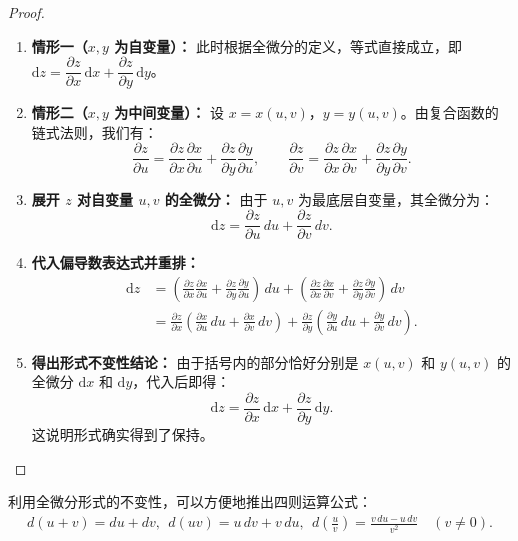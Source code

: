 \documentclass[lang=cn,11pt]{elegantbook}
\begin{document}
\begin{proof}
\begin{enumerate}
  \item \textbf{情形一（$x, y$ 为自变量）：}
  此时根据全微分的定义，等式直接成立，即 $\mathrm{d}z=\dfrac{\partial z}{\partial x}\,\mathrm{d}x+\dfrac{\partial z}{\partial y}\,\mathrm{d}y$。
  
  \item \textbf{情形二（$x, y$ 为中间变量）：}
  设 $x=x(u,v)$，$y=y(u,v)$。由复合函数的链式法则，我们有：
  \[
  \frac{\partial z}{\partial u}
  =\frac{\partial z}{\partial x}\frac{\partial x}{\partial u}
  +\frac{\partial z}{\partial y}\frac{\partial y}{\partial u},
  \qquad
  \frac{\partial z}{\partial v}
  =\frac{\partial z}{\partial x}\frac{\partial x}{\partial v}
  +\frac{\partial z}{\partial y}\frac{\partial y}{\partial v}.
  \]
  
  \item \textbf{展开 $z$ 对自变量 $u, v$ 的全微分：}
  由于 $u, v$ 为最底层自变量，其全微分为：
  \[
  \mathrm{d}z = \frac{\partial z}{\partial u}\,du + \frac{\partial z}{\partial v}\,dv.
  \]
  
  \item \textbf{代入偏导数表达式并重排：}
  \begin{align*}
  \mathrm{d}z &= \left(\frac{\partial z}{\partial x}\frac{\partial x}{\partial u} + \frac{\partial z}{\partial y}\frac{\partial y}{\partial u}\right)\,du + \left(\frac{\partial z}{\partial x}\frac{\partial x}{\partial v} + \frac{\partial z}{\partial y}\frac{\partial y}{\partial v}\right)\,dv\\
     &= \frac{\partial z}{\partial x}\left(\frac{\partial x}{\partial u}\,du+\frac{\partial x}{\partial v}\,dv\right) + \frac{\partial z}{\partial y}\left(\frac{\partial y}{\partial u}\,du+\frac{\partial y}{\partial v}\,dv\right).
  \end{align*}
  
  \item \textbf{得出形式不变性结论：}
  由于括号内的部分恰好分别是 $x(u,v)$ 和 $y(u,v)$ 的全微分 $\mathrm{d}x$ 和 $\mathrm{d}y$，代入后即得：
  \[
  \mathrm{d}z = \frac{\partial z}{\partial x}\,\mathrm{d}x + \frac{\partial z}{\partial y}\,\mathrm{d}y.
  \]
  这说明形式确实得到了保持。
\end{enumerate}
\end{proof}

\begin{property}[全微分的四则运算]
利用全微分形式的不变性，可以方便地推出四则运算公式：
\begin{align*}
d(u+v)=du+dv,~~d(uv)=u\,dv+v\,du,~~d\!\left(\frac{u}{v}\right)=\frac{v\,du-u\,dv}{v^2}\quad(v\neq 0).
\end{align*}
\end{property}
\end{document}
